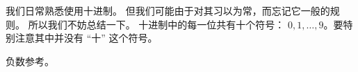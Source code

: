 
\begin{issues}
\issueDraft
\end{issues}

我们日常熟悉使用十进制。 但我们可能由于对其习以为常，而忘记它一般的规则。 所以我们不妨总结一下。 十进制中的每一位共有十个符号： $0,1,\dots, 9$。要特别注意其中并没有 “十” 这个符号。 


负数参考。
